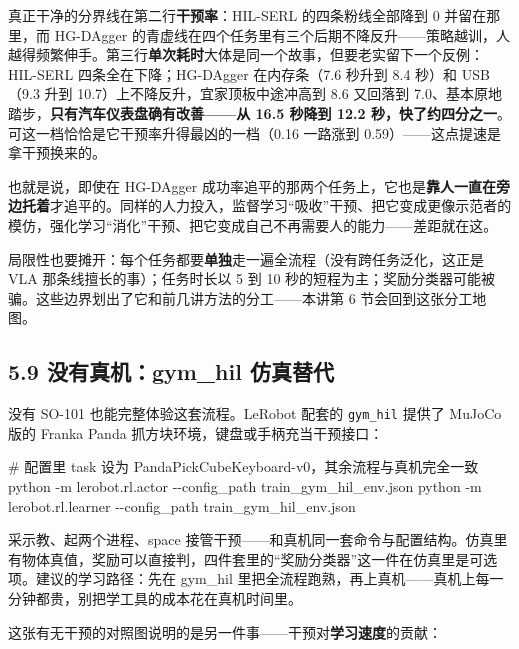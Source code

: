\documentclass[
  chinese,
]{ctexart}
\newenvironment{Shaded}{\begin{snugshade}}{\end{snugshade}}
\newcommand{\AttributeTok}[1]{\textcolor[rgb]{0.40,0.45,0.13}{#1}}
\newcommand{\CommentTok}[1]{\textcolor[rgb]{0.37,0.37,0.37}{#1}}
\newcommand{\ExtensionTok}[1]{\textcolor[rgb]{0.00,0.23,0.31}{#1}}
\newcommand{\NormalTok}[1]{\textcolor[rgb]{0.00,0.23,0.31}{#1}}
\begin{document}
真正干净的分界线在第二行\textbf{干预率}：HIL-SERL 的四条粉线全部降到 0
并留在那里，而 HG-DAgger
的青虚线在四个任务里有三个后期不降反升------策略越训，人越得频繁伸手。第三行\textbf{单次耗时}大体是同一个故事，但要老实留下一个反例：HIL-SERL
四条全在下降；HG-DAgger 在内存条（7.6 秒升到 8.4 秒）和 USB（9.3 升到
10.7）上不降反升，宜家顶板中途冲高到 8.6 又回落到
7.0、基本原地踏步，\textbf{只有汽车仪表盘确有改善------从 16.5 秒降到
12.2 秒，快了约四分之一}。可这一档恰恰是它干预率升得最凶的一档（0.16
一路涨到 0.59）------这点提速是拿干预换来的。

也就是说，即使在 HG-DAgger
成功率追平的那两个任务上，它也是\textbf{靠人一直在旁边托着}才追平的。同样的人力投入，监督学习``吸收''干预、把它变成更像示范者的模仿，强化学习``消化''干预、把它变成自己不再需要人的能力------差距就在这。

局限性也要摊开：每个任务都要\textbf{单独}走一遍全流程（没有跨任务泛化，这正是
VLA 那条线擅长的事）；任务时长以 5 到 10
秒的短程为主；奖励分类器可能被骗。这些边界划出了它和前几讲方法的分工------本讲第
6 节会回到这张分工地图。

\subsection{5.9 没有真机：gym\_hil
仿真替代}\label{ux6ca1ux6709ux771fux673agym_hil-ux4effux771fux66ffux4ee3}

没有 SO-101 也能完整体验这套流程。LeRobot 配套的 \texttt{gym\_hil}
提供了 MuJoCo 版的 Franka Panda 抓方块环境，键盘或手柄充当干预接口：

\begin{Shaded}
\begin{Highlighting}[]
\CommentTok{\# 配置里 task 设为 PandaPickCubeKeyboard{-}v0，其余流程与真机完全一致}
\ExtensionTok{python} \AttributeTok{{-}m}\NormalTok{ lerobot.rl.actor   }\AttributeTok{{-}{-}config\_path}\NormalTok{ train\_gym\_hil\_env.json}
\ExtensionTok{python} \AttributeTok{{-}m}\NormalTok{ lerobot.rl.learner }\AttributeTok{{-}{-}config\_path}\NormalTok{ train\_gym\_hil\_env.json}
\end{Highlighting}
\end{Shaded}

采示教、起两个进程、space
接管干预------和真机同一套命令与配置结构。仿真里有物体真值，奖励可以直接判，四件套里的``奖励分类器''这一件在仿真里是可选项。建议的学习路径：先在
gym\_hil
里把全流程跑熟，再上真机------真机上每一分钟都贵，别把学工具的成本花在真机时间里。

这张有无干预的对照图说明的是另一件事------干预对\textbf{学习速度}的贡献：
\end{document}
